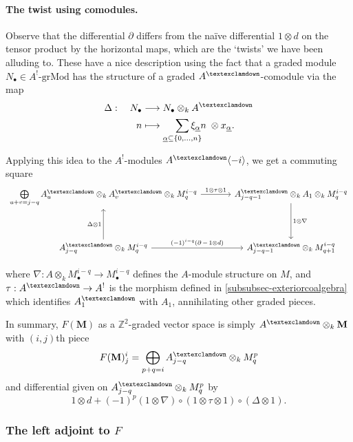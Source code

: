 \documentclass[a4paper]{article}
\theoremstyle{definition}
\theoremstyle{remark}
\newcommand{\grMod}{\ensuremath{\text{-grMod}}}
\newcommand{\gnab}{{\textexclamdown}}
\begin{document}
\paragraph{The twist using comodules.}
\label{comoduletwist}
Observe that the differential \(\partial\) differs from the na\"ive differential
\(1\otimes d\) on the tensor product by the horizontal maps, which are the
`twists' we have been alluding to. These have a nice description using the fact
that a graded module \(N_\bullet\in A^!\grMod\) has the structure of a
graded \(A^\gnab\)-comodule via the map
\begin{align*}
    \Delta: \quad N_\bullet &\longrightarrow N_\bullet \otimes_k A^\gnab \\
    n &\longmapsto \smashoperator[r]{\sum\limits_{\underline{\alpha}\subseteq
    \{0,...,n\}}} \xi_{\underline{\alpha}} n
    \; \otimes   x_{\underline{\alpha}}.
\end{align*}

Applying this idea to the \(A^!\)-modules \(A^\gnab\langle -i \rangle\), we get
a commuting square
\[\begin{tikzcd}[column sep=large, row sep=huge]  
    \bigoplus\limits_{u+v=j-q}A^\gnab_{u} \otimes_k A^\gnab_v \otimes_k
    M^{i-q}_q 
    \arrow[r, "1\otimes \tau \otimes 1"]
    & A^\gnab_{j-q-1} \otimes_k A_1 \otimes_k M^{i-q}_{q} 
    \arrow[d, "1\otimes \nabla"] \\
    A^\gnab_{j-q} \otimes_k M^{i-q}_q
    \arrow[u, "\Delta \otimes 1"] 
    \arrow[r, "(-1)^{i-q}(\partial \,- \,1\otimes d)"]
    &A^\gnab_{j-q-1} \otimes_k M^{i-q}_{q+1}
\end{tikzcd}\]

where \(\nabla: A\otimes_k M^{i-q}_\bullet \rightarrow M^{i-q}_\bullet\) defines the
\(A\)-module structure on \(M\), and \(\tau:A^\gnab \rightarrow A^!\) is the
morphism defined in \cref{subsubsec-exteriorcoalgebra} which identifies
\(A^\gnab_1\) with \(A_{1}\), annihilating other graded pieces. 

In summary, \(F(\mathbf{M})\) as a \(\mathbb{Z}^2\)-graded vector space is
simply \(A^\gnab \otimes_{k} \mathbf{M}\)  with \((i,j)\)th piece
\[F(\mathbf{M})^i_j = \bigoplus_{p+q=i}A^\gnab_{j-q}\otimes_k M^p_q\]
and differential given on \(A^\gnab_{j-q}\otimes_k M^p_q\) by 
\[1\otimes d + (-1)^{p}(1\otimes \nabla)\circ (1\otimes \tau \otimes
1)\circ(\Delta\otimes 1).\]



\subsubsection{The left adjoint to \(F\)}
\end{document}

